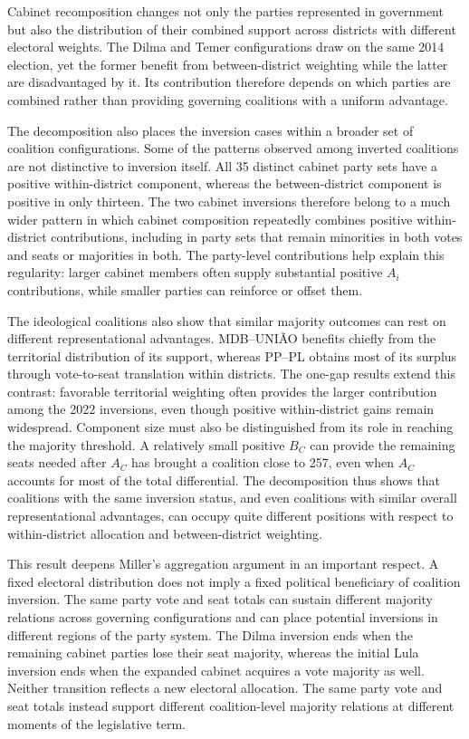 \documentclass[11pt]{article}
\begin{document}
Cabinet recomposition changes not only the parties represented in government but
also the distribution of their combined support across districts with different
electoral weights. The Dilma and Temer configurations draw on the same 2014
election, yet the former benefit from between-district weighting while the
latter are disadvantaged by it. Its contribution therefore depends on which
parties are combined rather than providing governing coalitions with a uniform
advantage.


The decomposition also places the inversion cases within a broader set of
coalition configurations. Some of the patterns observed
among inverted coalitions are not distinctive to inversion itself. All 35
distinct cabinet party sets have a positive within-district component,
whereas the between-district component is positive in only thirteen. The
two cabinet inversions therefore belong to a much wider pattern in which
cabinet composition repeatedly combines positive within-district
contributions, including in party sets that remain minorities in both votes
and seats or majorities in both. The party-level contributions help explain
this regularity: larger cabinet members often supply substantial positive
\(A_i\) contributions, while smaller parties can reinforce or offset them.


The ideological coalitions also show that similar majority outcomes can rest on
different representational advantages. MDB--UNIÃO benefits chiefly from the
territorial distribution of its support, whereas PP--PL obtains most of its
surplus through vote-to-seat translation within districts. The one-gap results
extend this contrast: favorable territorial weighting often provides the larger
contribution among the 2022 inversions, even though positive within-district
gains remain widespread. Component size must also be distinguished from its role
in reaching the majority threshold. A relatively small positive \(B_C\) can
provide the remaining seats needed after \(A_C\) has brought a coalition close
to 257, even when \(A_C\) accounts for most of the total differential. The
decomposition thus shows that coalitions with the same inversion status, and
even coalitions with similar overall representational advantages, can occupy
quite different positions with respect to within-district allocation and
between-district weighting.

This result deepens Miller's aggregation argument in an important respect. A
fixed electoral distribution does not imply a fixed political beneficiary of
coalition inversion. The same party vote and seat totals can sustain different
majority relations across governing configurations and can place potential
inversions in different regions of the party system. The Dilma inversion ends
when the remaining cabinet parties lose their seat majority, whereas the initial
Lula inversion ends when the expanded cabinet acquires a vote majority as well.
Neither transition reflects a new electoral allocation. The same party vote and
seat totals instead support different coalition-level majority relations at
different moments of the legislative term.
\end{document}

